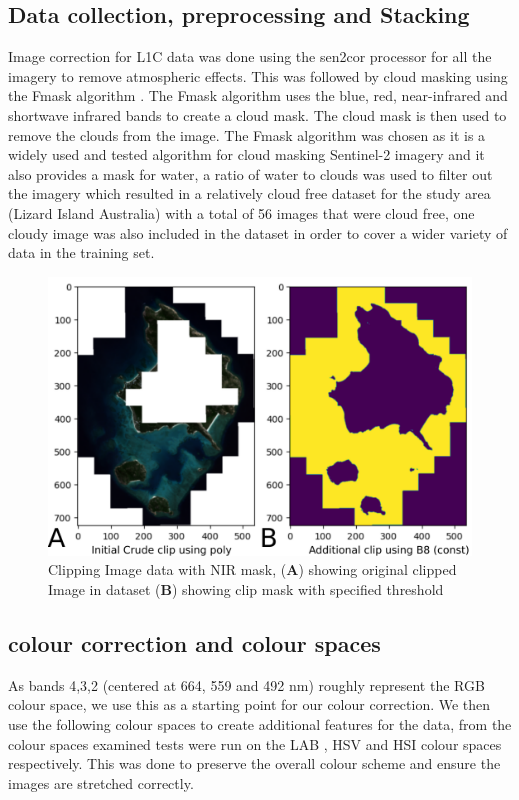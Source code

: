 \documentclass[journal,article,submit,pdftex,moreauthors]{Definitions/mdpi}
\begin{document}
\subsection*{Data collection, preprocessing and Stacking}
Image correction for L1C data was done using the sen2cor processor for all the imagery to remove atmospheric effects. This was followed by cloud masking using the Fmask algorithm \cite{Zhe2012}. The Fmask algorithm uses the blue, red, near-infrared and shortwave infrared bands to create a cloud mask. 
The cloud mask is then used to remove the clouds from the image. The Fmask algorithm was chosen as it is a widely used and tested algorithm for cloud masking Sentinel-2 imagery and it also provides a mask for water, a ratio of water to clouds was used to filter out the imagery which resulted 
in a relatively cloud free dataset for the study area (Lizard Island Australia) with a total of 56 images that were cloud free, one cloudy image was also included in the dataset in order to cover a wider variety of data in the training set.

\begin{figure}
	\centering
	\includegraphics[width=0.7\linewidth]{Images/Preproc_Workflow.pdf}
	\caption{Clipping Image data with NIR mask, (\textbf{A}) showing original clipped Image in dataset (\textbf{B}) showing clip mask with specified threshold}
	\label{fig:PreprocWorkflow}
\end{figure}

\subsection*{colour correction and colour spaces}
As bands 4,3,2 (centered at 664, 559 and 492 nm) roughly represent the RGB colour space, we use this as a starting point for our colour correction. We then use the following colour spaces to create additional features for the data, from the colour spaces examined tests were run on the LAB \cite{wyszecki2000color}, HSV and HSI \cite{gonzalezr2006digital} 
colour spaces respectively. This was done to preserve the overall colour scheme and ensure the images are stretched correctly.  
\end{document}
